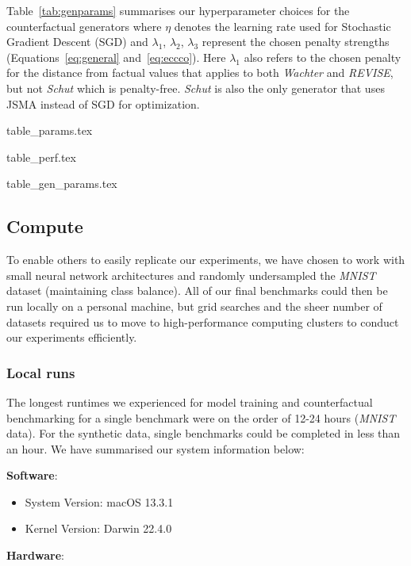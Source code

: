 Table~\ref{tab:genparams} summarises our hyperparameter choices for the counterfactual generators where $\eta$ denotes the learning rate used for Stochastic Gradient Descent (SGD) and $\lambda_1$, $\lambda_2$, $\lambda_3$ represent the chosen penalty strengths (Equations~\ref{eq:general} and~\ref{eq:eccco}). Here $\lambda_1$ also refers to the chosen penalty for the distance from factual values that applies to both \textit{Wachter} and \textit{REVISE}, but not \textit{Schut} which is penalty-free. \textit{Schut} is also the only generator that uses JSMA instead of SGD for optimization.

{table_params.tex}

{table_perf.tex}

{table_gen_params.tex}

\subsection{Compute}

To enable others to easily replicate our experiments, we have chosen to work with small neural network architectures and randomly undersampled the \textit{MNIST} dataset (maintaining class balance). All of our final benchmarks could then be run locally on a personal machine, but grid searches and the sheer number of datasets required us to move to high-performance computing clusters to conduct our experiments efficiently. 

\subsubsection{Local runs}

The longest runtimes we experienced for model training and counterfactual benchmarking for a single benchmark were on the order of 12-24 hours (\textit{MNIST} data). For the synthetic data, single benchmarks could be completed in less than an hour. We have summarised our system information below:

\textbf{Software}:

\begin{itemize}
  \item System Version: macOS 13.3.1
  \item Kernel Version: Darwin 22.4.0
\end{itemize}

\textbf{Hardware}:

